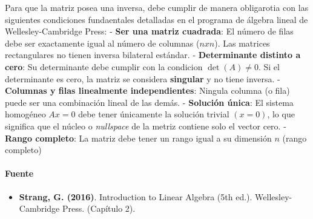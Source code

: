 \documentclass[11pt]{article}
\providecommand{\tightlist}{%
      \setlength{\itemsep}{0pt}\setlength{\parskip}{0pt}}
\begin{document}
Para que la matriz posea una inversa, debe cumplir de manera obligarotia
con las siguientes condiciones fundaentales detalladas en el programa de
álgebra lineal de Wellesley-Cambridge Press: - \textbf{Ser una matriz
cuadrada}: El número de filas debe ser exactamente igual al número de
columnas (\(nxn\)). Las matrices rectangulares no tienen inversa
bilateral estándar. - \textbf{Determinante distinto a cero}: Su
determinante debe cumplir con la condicion \(\det{(A)} \neq 0\). Si el
determinante es cero, la matriz se considera \textbf{singular} y no
tiene inversa. - \textbf{Columnas y filas linealmente independientes}:
Ningula columna (o fila) puede ser una combinación lineal de las demás.
- \textbf{Solución única}: El sistema homogéneo \(Ax = 0\) debe tener
únicamente la solución trivial \((x = 0)\), lo que significa que el
núcleo o \emph{nullspace} de la metriz contiene solo el vector cero. -
\textbf{Rango completo}: La matriz debe tener un rango igual a su
dimensión \(n\) (rango completo)

\paragraph{Fuente}\label{fuente}

\begin{itemize}
\tightlist
\item
  \textbf{Strang, G. (2016)}. Introduction to Linear Algebra (5th ed.).
  Wellesley-Cambridge Press. (Capítulo 2).
\end{itemize}
\end{document}
